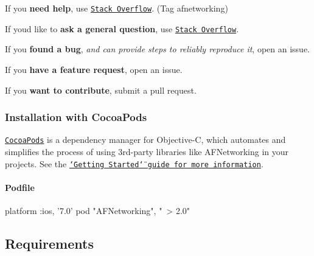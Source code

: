 \begin{DoxyItemize}
\item If you {\bfseries need help}, use \href{http://stackoverflow.com/questions/tagged/afnetworking}{\tt Stack Overflow}. (Tag \textquotesingle{}afnetworking\textquotesingle{})
\item If you\textquotesingle{}d like to {\bfseries ask a general question}, use \href{http://stackoverflow.com/questions/tagged/afnetworking}{\tt Stack Overflow}.
\item If you {\bfseries found a bug}, {\itshape and can provide steps to reliably reproduce it}, open an issue.
\item If you {\bfseries have a feature request}, open an issue.
\item If you {\bfseries want to contribute}, submit a pull request.
\end{DoxyItemize}

\subsubsection*{Installation with Cocoa\+Pods}

\href{https://cocoapods.org/}{\tt Cocoa\+Pods} is a dependency manager for Objective-\/C, which automates and simplifies the process of using 3rd-\/party libraries like A\+F\+Networking in your projects. See the \href{https://github.com/AFNetworking/AFNetworking/wiki/Getting-Started-with-AFNetworking}{\tt \char`\"{}\+Getting Started\char`\"{} guide for more information}.

\paragraph*{Podfile}


\begin{DoxyCode}
platform :ios, '7.0'
pod "AFNetworking", "~> 2.0"
\end{DoxyCode}


\subsection*{Requirements}

